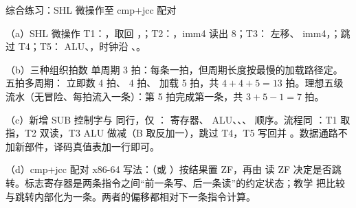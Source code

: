 \begin{chapteranswer}{综合练习：SHL 微操作至 cmp+jcc 配对}
\begin{answersubproblem}{（a）SHL 微操作}
T1：，取回 ，；T2：，imm4 读出 8；T3： 左移、 imm4，；跳过 T4；T5： ALU、，时钟沿 、。
\end{answersubproblem}
\begin{answersubproblem}{（b）三种组织拍数}
单周期 3 拍：每条一拍，但周期长度按最慢的加载路径定。五拍多周期： 立即数 4 拍、 4 拍、 加载 5 拍，共 $4+4+5=13$ 拍。理想五级流水（无冒险、每拍流入一条）：第 5 拍完成第一条，共 $3+5-1=7$ 拍。
\end{answersubproblem}
\begin{answersubproblem}{（c）新增 SUB}
控制字与  同行，仅 ： 寄存器、 ALU、、、 顺序。流程同 ：T1 取指，T2 双读，T3 ALU 做减（B 取反加一），跳过 T4，T5 写回并 。数据通路不加新部件，译码真值表加一行即可。
\end{answersubproblem}
\begin{answersubproblem}{（d）cmp+jcc 配对}
x86-64 写法：（或 ）按结果置 ZF，再由  读 ZF 决定是否跳转。标志寄存器是两条指令之间“前一条写、后一条读”的约定状态；教学  把比较与跳转内部化为一条。两者的偏移都相对下一条指令计算。
\end{answersubproblem}
\end{chapteranswer}

